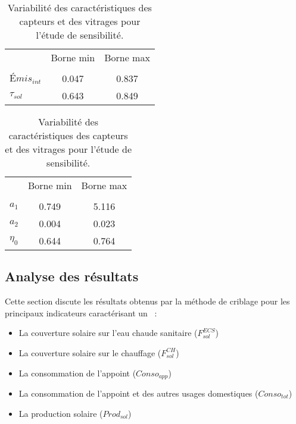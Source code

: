 \begin{table}
\centering
\caption[Variabilité des caractéristiques des capteurs et des vitrages pour l’étude
         de sensibilité]
        {Variabilité des caractéristiques des capteurs et des vitrages pour l’étude
         de sensibilité.}
\label{tab:variabilite_capteur_vitrage}
\begin{minipage}[t][][b]{0.45\linewidth}
\begin{tabular}{l c c}
  \toprule
  \addlinespace
                                               & Borne min     & Borne max    \\
  \addlinespace[\defaultaddspace]
  \multicolumn{2}{l}{\textbf{Vitrages}}                                       \\
  \midrule
  $Émis_{int}$                                 & \num{0.047}   & \num{0.837}  \\
  $\tau_{sol}$                                 & \num{0.643}   & \num{0.849}  \\
  \bottomrule
  \end{tabular}
\end{minipage}%
\begin{minipage}[t][][b]{0.45\linewidth}
\begin{tabular}{l c c}
  \toprule
  \addlinespace
                                               & Borne min     & Borne max    \\
  \addlinespace[\defaultaddspace]
  \multicolumn{3}{l}{\textbf{Capteurs solaires}}                              \\
  \midrule
  $a_{1}$                                      & \num{0.749}   &  \num{5.116} \\
  $a_{2}$                                      & \num{0.004}   &  \num{0.023} \\
  $\eta_{0}$                                   & \num{0.644}   &  \num{0.764} \\
  \bottomrule
  \end{tabular}
\end{minipage}
\end{table}



\subsection{Analyse des résultats} %
\label{sub:analyse_des_resultats_morris}
Cette section discute les résultats obtenus par la méthode de criblage pour
les principaux indicateurs caractérisant un ~:
\begin{itemize}
  \item La couverture solaire sur l’eau chaude sanitaire ($F_{sol}^{ECS}$)
  \item La couverture solaire sur le chauffage ($F_{sol}^{CH}$)
  \item La consommation de l’appoint ($Conso_{app}$)
  \item La consommation de l’appoint et des autres usages domestiques ($Conso_{tot}$)
  \item La production solaire ($Prod_{sol}$)
\end{itemize}

